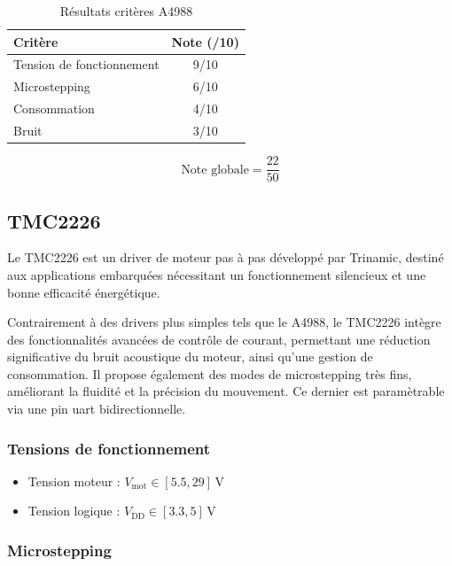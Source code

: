 \begin{table}[H]
    \centering
    \begin{tabular}{|l|c|}
        \hline
        \textbf{Critère} & \textbf{Note (/10)} \\
        \hline
        Tension de fonctionnement & 9/10 \\
        \hline
        Microstepping & 6/10 \\
        \hline
        Consommation & 4/10 \\
        \hline
        Bruit & 3/10 \\
        \hline
    \end{tabular}
    \caption{Résultats critères A4988}
    \label{tab:a4988_resultats}
\end{table}

$$
\text{Note globale} = \frac{22}{50}
$$

\subsection{TMC2226}

Le TMC2226 \cite{TMC2226_datasheet} est un driver de moteur pas à pas développé par Trinamic, destiné aux applications embarquées nécessitant un fonctionnement silencieux et une bonne efficacité énergétique.

Contrairement à des drivers plus simples tels que le A4988, le TMC2226 intègre des fonctionnalités avancées de contrôle de courant, permettant une réduction significative du bruit acoustique du moteur, ainsi qu'une gestion de consommation. Il propose également des modes de microstepping très fins, améliorant la fluidité et la précision du mouvement.
Ce dernier est paramètrable via une pin \Gls{uart} bidirectionnelle.

\subsubsection{Tensions de fonctionnement}

\begin{itemize}
    \item Tension moteur : $V_{\mathrm{mot}} \in [5.5, 29]\,\mathrm{V}$
    \item Tension logique : $V_{\mathrm{DD}} \in [3.3, 5]\,\mathrm{V}$
\end{itemize}

\subsubsection{Microstepping}

